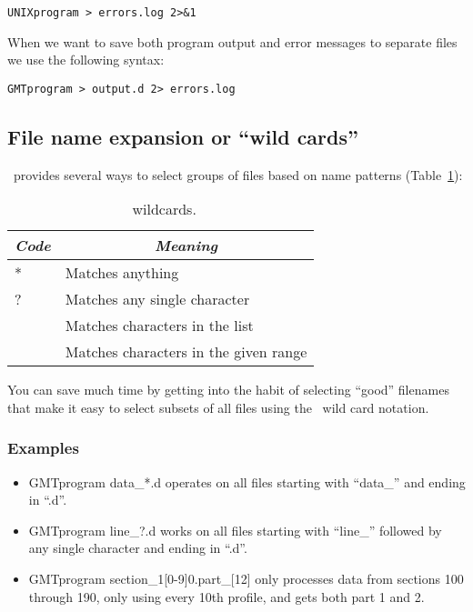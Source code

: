 \documentclass[11pt]{report}
\begin{document}
{\small\begin{verbatim}
UNIXprogram > errors.log 2>&1
\end{verbatim}
}

When we want to save both program output and error messages to
separate files we use the following syntax:

{\small\begin{verbatim}
GMTprogram > output.d 2> errors.log
\end{verbatim}
}

\subsection{File name expansion or ``wild cards''}

\UNIX\ provides several ways to select groups of files based
on name patterns (Table~\ref{tbl:wildcard}):

\begin{table}[h]
\small
\centering
\begin{tabular}{|l|l|} \hline
\multicolumn{1}{|c|}{\emph{Code}} & \multicolumn{1}{c|}{\emph{Meaning}} \\ \hline
*       &       Matches anything \\ \hline
?       &       Matches any single character \\ \hline
[\emph{list}]   &       Matches characters in the list \\ \hline
[\emph{range}]  &       Matches characters in the given range \\ \hline
\end{tabular}
\caption{\UNIX\ wildcards.} \label{tbl:wildcard}
\end{table}
 
\noindent
You can save much time by getting into the habit of selecting
``good'' filenames that make it easy to select subsets of all
files using the \UNIX\ wild card notation.

\subsubsection{Examples}

\begin{itemize}
\item GMTprogram data\_*.d operates on all files starting with
``data\_'' and ending in ``.d''.

\item GMTprogram line\_?.d works on all files starting with
``line\_'' followed by any single character and ending in ``.d''.

\item GMTprogram section\_1[0-9]0.part\_[12] only processes data
from sections 100 through 190, only using every 10th profile, and
gets both part 1 and 2.

\end{itemize} 
\end{document}

